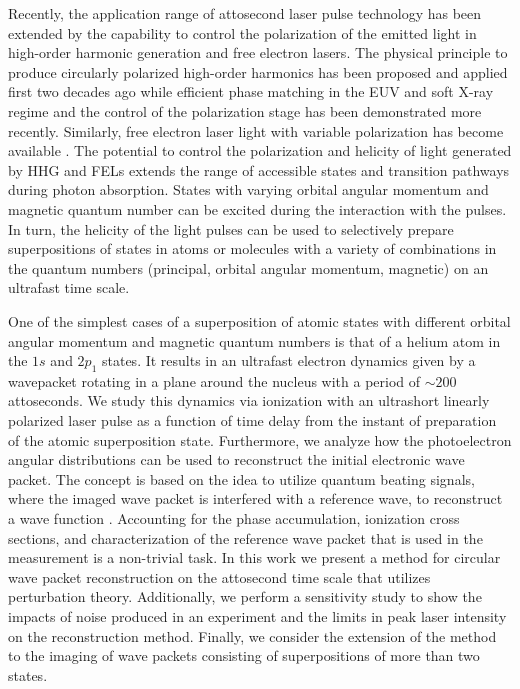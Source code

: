 Recently, the application range of attosecond laser pulse technology has been extended by the capability to control the polarization of the emitted light in high-order harmonic generation and free electron lasers. The physical principle to produce circularly polarized high-order harmonics has been proposed and applied first two decades ago \cite{eichmann1995} while efficient phase matching in the EUV and soft X-ray regime \cite{fleischer2014,fan2015,hickstein2015} and the control of the polarization stage \cite{huang2018} has been demonstrated more recently. Similarly, free electron laser light with variable polarization has become available \cite{spezzani2011,mazza2014}. The potential to control the polarization and helicity of light generated by HHG and FELs extends the range of accessible states and transition pathways during photon absorption. States with varying orbital angular momentum and magnetic quantum number can be excited during the interaction with the pulses. In turn, the helicity of the light pulses can be used to selectively prepare superpositions of states in atoms or molecules with a variety of combinations in the quantum numbers (principal, orbital angular momentum, magnetic) on an ultrafast time scale. 

One of the simplest cases of a superposition of atomic states with different orbital angular momentum and magnetic quantum numbers is that of a helium atom in the $1s$ and $2p_1$ states. It results in an ultrafast electron dynamics given by a wavepacket rotating in a plane around the nucleus with a period of $\sim200$ attoseconds. We study this dynamics via ionization with an ultrashort linearly polarized laser pulse as a function of time delay from the instant of preparation of the atomic superposition state. Furthermore, we analyze how the photoelectron angular distributions can be used to reconstruct the initial electronic wave packet. The concept is based on the idea to utilize quantum beating signals, where the imaged wave packet is interfered with a reference wave, to reconstruct a wave function \cite{paul2001,muller2002,Mauritsson2010,klunder2013,priebe2017,jiang2020}. Accounting for the phase accumulation, ionization cross sections, and characterization of the reference wave packet that is used in the measurement is a non-trivial task. In this work we present a method for circular wave packet reconstruction on the attosecond time scale that utilizes perturbation theory. Additionally, we perform a sensitivity study to show the impacts of noise produced in an experiment and the limits in peak laser intensity on the reconstruction method. Finally, we consider the extension of the method to the imaging of wave packets consisting of superpositions of more than two states.

